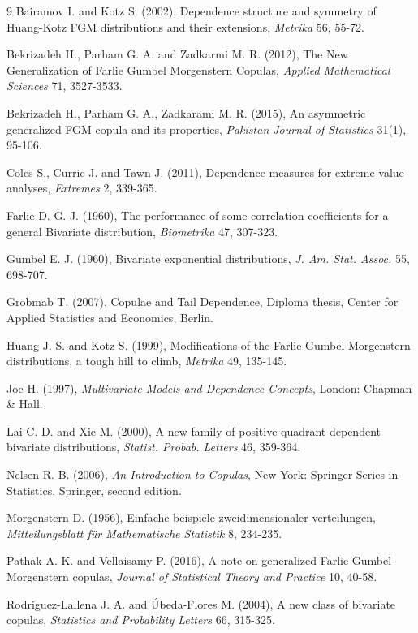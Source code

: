 \documentclass[twoside]{article}
\numberwithin{equation}{section}
\begin{document}
\begin{thebibliography}{9}
Bairamov I. and Kotz S. (2002), Dependence structure and symmetry of Huang-Kotz FGM distributions and their extensions, {\it Metrika} 56, 55-72.

Bekrizadeh H., Parham G. A. and Zadkarmi M. R. (2012), The New Generalization of Farlie Gumbel Morgenstern Copulas, {\it Applied Mathematical Sciences} 71, 3527-3533.

Bekrizadeh H., Parham G. A., Zadkarami M. R. (2015), An asymmetric generalized FGM copula and its properties, {\it Pakistan Journal of Statistics} 31(1), 95-106.

Coles S., Currie J. and Tawn J. (2011), Dependence measures for extreme value analyses, {\it Extremes} 2, 339-365.

Farlie D. G. J. (1960), The performance of some correlation coefficients for a general Bivariate distribution, {\it Biometrika} 47, 307-323.

Gumbel E. J. (1960), Bivariate exponential distributions, {\it J. Am. Stat. Assoc.} 55, 698-707.

Gr\"obmab T. (2007), Copulae and Tail Dependence, Diploma thesis, Center for Applied Statistics and Economics, Berlin.

Huang J. S. and Kotz S. (1999), Modifications of the Farlie-Gumbel-Morgenstern distributions, a tough hill to climb, {\it Metrika} 49, 135-145.

Joe H. (1997), {\it Multivariate Models and Dependence Concepts}, London: Chapman \& Hall.

Lai C. D. and Xie M. (2000), A new family of positive quadrant dependent bivariate distributions, {\it Statist. Probab. Letters} 46, 359-364.

Nelsen R. B. (2006), {\it An Introduction to Copulas}, New York: Springer Series in Statistics, Springer, second edition.

Morgenstern D. (1956), Einfache beispiele zweidimensionaler verteilungen, {\it Mitteilungsblatt f\"ur Mathematische Statistik} 8, 234-235.

Pathak A. K. and Vellaisamy P. (2016), A note on generalized Farlie-Gumbel-Morgenstern copulas, {\it Journal of Statistical Theory and Practice} 10, 40-58.

Rodriguez-Lallena J. A. and \'Ubeda-Flores M. (2004), A new class of bivariate copulas, {\it Statistics and Probability Letters} 66, 315-325.
\end{thebibliography}
\end{document}
